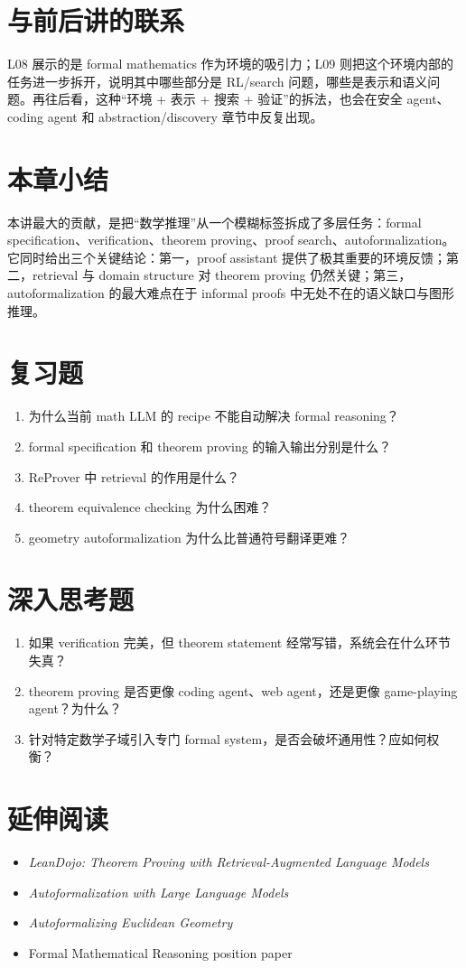 \section{与前后讲的联系}

L08 展示的是 formal mathematics 作为环境的吸引力；L09 则把这个环境内部的任务进一步拆开，说明其中哪些部分是 RL/search 问题，哪些是表示和语义问题。再往后看，这种“环境 + 表示 + 搜索 + 验证”的拆法，也会在安全 agent、coding agent 和 abstraction/discovery 章节中反复出现。

\section{本章小结}

本讲最大的贡献，是把“数学推理”从一个模糊标签拆成了多层任务：formal specification、verification、theorem proving、proof search、autoformalization。它同时给出三个关键结论：第一，proof assistant 提供了极其重要的环境反馈；第二，retrieval 与 domain structure 对 theorem proving 仍然关键；第三，autoformalization 的最大难点在于 informal proofs 中无处不在的语义缺口与图形推理。

\section{复习题}

\begin{enumerate}
\item 为什么当前 math LLM 的 recipe 不能自动解决 formal reasoning？
\item formal specification 和 theorem proving 的输入输出分别是什么？
\item ReProver 中 retrieval 的作用是什么？
\item theorem equivalence checking 为什么困难？
\item geometry autoformalization 为什么比普通符号翻译更难？
\end{enumerate}

\section{深入思考题}

\begin{enumerate}
\item 如果 verification 完美，但 theorem statement 经常写错，系统会在什么环节失真？
\item theorem proving 是否更像 coding agent、web agent，还是更像 game-playing agent？为什么？
\item 针对特定数学子域引入专门 formal system，是否会破坏通用性？应如何权衡？
\end{enumerate}

\section{延伸阅读}

\begin{itemize}
\item \emph{LeanDojo: Theorem Proving with Retrieval-Augmented Language Models}
\item \emph{Autoformalization with Large Language Models}
\item \emph{Autoformalizing Euclidean Geometry}
\item Formal Mathematical Reasoning position paper
\end{itemize}
